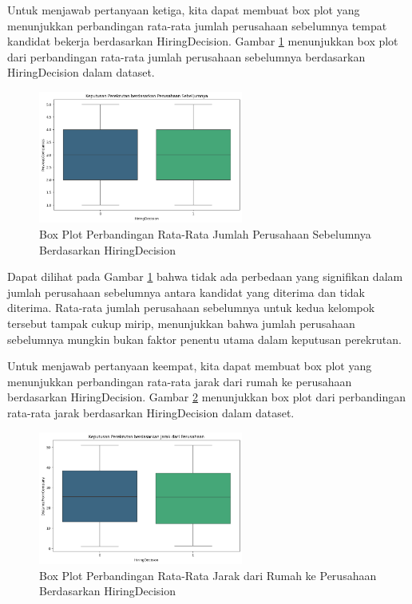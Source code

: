 Untuk menjawab pertanyaan ketiga, kita dapat membuat box plot yang menunjukkan perbandingan rata-rata jumlah perusahaan sebelumnya tempat kandidat bekerja berdasarkan HiringDecision. Gambar \ref{fig:prev} menunjukkan box plot dari perbandingan rata-rata jumlah perusahaan sebelumnya berdasarkan HiringDecision dalam dataset.

\begin{figure}[H]
    \centering
    \includegraphics[width=0.6\textwidth]{gambar/prev.png}
    \caption{Box Plot Perbandingan Rata-Rata Jumlah Perusahaan Sebelumnya Berdasarkan HiringDecision}
    \label{fig:prev}
\end{figure}

Dapat dilihat pada Gambar \ref{fig:prev} bahwa tidak ada perbedaan yang signifikan dalam jumlah perusahaan sebelumnya antara kandidat yang diterima dan tidak diterima. Rata-rata jumlah perusahaan sebelumnya untuk kedua kelompok tersebut tampak cukup mirip, menunjukkan bahwa jumlah perusahaan sebelumnya mungkin bukan faktor penentu utama dalam keputusan perekrutan.

Untuk menjawab pertanyaan keempat, kita dapat membuat box plot yang menunjukkan perbandingan rata-rata jarak dari rumah ke perusahaan berdasarkan HiringDecision. Gambar \ref{fig:dist} menunjukkan box plot dari perbandingan rata-rata jarak berdasarkan HiringDecision dalam dataset.

\begin{figure}[H]
    \centering
    \includegraphics[width=0.6\textwidth]{gambar/dist.png}
    \caption{Box Plot Perbandingan Rata-Rata Jarak dari Rumah ke Perusahaan Berdasarkan HiringDecision}
    \label{fig:dist}
\end{figure}

